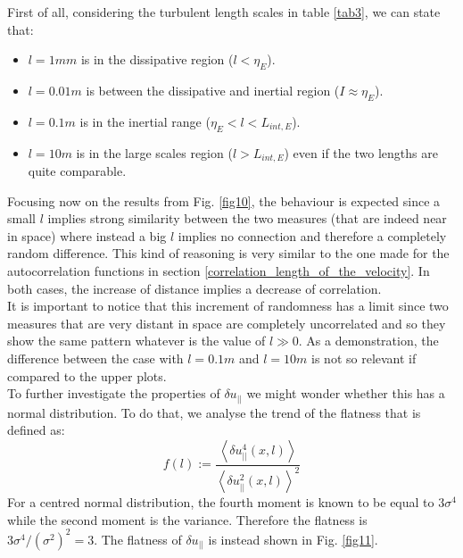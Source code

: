 \documentclass[11pt,titlepage]{article}
\begin{document}
First of all, considering the turbulent length scales in table \ref{tab3}, we can state that:
\begin{itemize}
	\item $l=1mm$ is in the dissipative region ($l<\eta_E$).
	\item $l=0.01m$ is between the dissipative and inertial region ($I \approx \eta_E$).
	\item $l=0.1m$ is in the inertial range ($\eta_E < l < L_{int,E}$).
	\item $l=10m$ is in the large scales region ($l > L_{int,E}$) even if the two lengths are quite comparable.
\end{itemize}

Focusing now on the results from Fig. \ref{fig10}, the behaviour is expected since a small $l$ implies strong similarity between the two measures (that are indeed near in space) where instead a big $l$ implies no connection and therefore a completely random difference. This kind of reasoning is very similar to the one made for the autocorrelation functions in section \ref{correlation_length_of_the_velocity}. In both cases, the increase of distance implies a decrease of correlation. \\
It is important to notice that this increment of randomness has a limit since two measures that are very distant in space are completely uncorrelated and so they show the same pattern whatever is the value of $l\gg0$. As a demonstration, the difference between the case with $l=0.1m$ and $l=10m$ is not so relevant if compared to the upper plots. \\
To further investigate the properties of $\delta u_{||}$ we might wonder whether this has a normal distribution. To do that, we analyse the trend of the flatness that is defined as:
\begin{equation*}
	f(l) := \frac{\left<\delta u_{||}^4(x,l)\right>}{{\left<\delta u_{||}^2(x,l)\right>}^2}
\end{equation*}
For a centred normal distribution, the fourth moment is known to be equal to $3\sigma^4$ while the second moment is the variance. Therefore the flatness is $3\sigma^4/(\sigma^2)^2 = 3$. The flatness of $\delta u_{||}$ is instead shown in Fig. \ref{fig11}.
\end{document}
